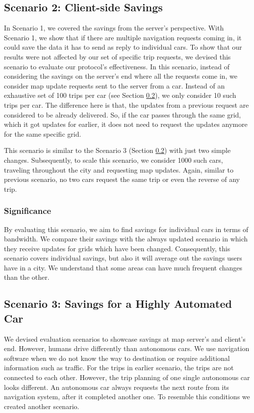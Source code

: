 \subsection{Scenario 2: Client-side Savings} \label{10trips}
In Scenario 1, we covered the savings from the server's perspective. With Scenario 1, we show that if there are multiple navigation requests coming in, it could save the data it has to send as reply to individual cars. To show that our results were not affected by our set of specific trip requests, we devised this scenario to evaluate our protocol's effectiveness. In this scenario, instead of considering the savings on the server's end where all the requests come in, we consider map update requests sent to the server from a car. Instead of an exhaustive set of 100 trips per car (see Section \ref{scenario3}), we only consider 10 such trips per car. The difference here is that, the updates from a previous request are considered to be already delivered. So, if the car passes through the same grid, which it got updates for earlier, it does not need to request the updates anymore for the same specific grid.   

This scenario is similar to the Scenario 3 (Section \ref{scenario3}) with just two simple changes. Subsequently, to scale this scenario, we consider 1000 such cars, traveling throughout the city and requesting map updates. Again, similar to previous scenario, no two cars request the same trip or even the reverse of any trip.\\

\subsubsection{Significance}
By evaluating this scenario, we aim to find savings for individual cars in terms of bandwidth. We compare their savings with the always updated scenario in which they receive updates for grids which have been changed. Consequently, this scenario covers individual savings, but also it will average out the savings users have in a city. We understand that some areas can have much frequent changes than the other. 


\subsection{Scenario 3: Savings for a Highly Automated Car} \label{scenario3}
We devised evaluation scenarios to showcase savings at map server's and client's end. However, humans drive differently than autonomous cars. We use navigation software when we do not know the way to destination or require additional information such as traffic. For the trips in earlier scenario, the trips are not connected to each other. However, the trip planning of one single autonomous car looks different. An autonomous car always requests the next route from its navigation system, after it completed another one. To resemble this conditions we created another scenario. \\

